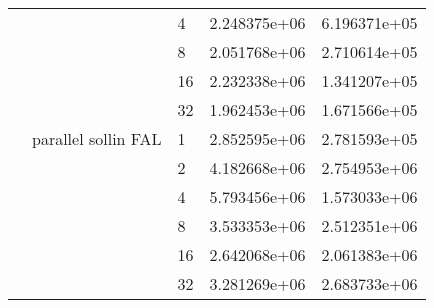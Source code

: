 \begin{tabular}{lllrr}
                                                       &                     & 4  &  2.248375e+06 &  6.196371e+05 \\
                                                       &                     & 8  &  2.051768e+06 &  2.710614e+05 \\
                                                       &                     & 16 &  2.232338e+06 &  1.341207e+05 \\
                                                       &                     & 32 &  1.962453e+06 &  1.671566e+05 \\
                                                       & parallel sollin FAL & 1  &  2.852595e+06 &  2.781593e+05 \\
                                                       &                     & 2  &  4.182668e+06 &  2.754953e+06 \\
                                                       &                     & 4  &  5.793456e+06 &  1.573033e+06 \\
                                                       &                     & 8  &  3.533353e+06 &  2.512351e+06 \\
                                                       &                     & 16 &  2.642068e+06 &  2.061383e+06 \\
                                                       &                     & 32 &  3.281269e+06 &  2.683733e+06 \\
\bottomrule
\end{tabular}
